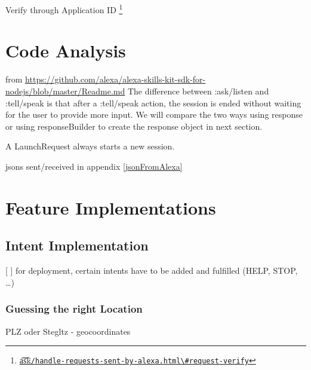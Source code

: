 Verify through Application ID \footnote{\href{https://developer.amazon.com/docs/custom-skills/handle-requests-sent-by-alexa.html\#request-verify}{\t{a\t{sk}}\lstinline|/handle-requests-sent-by-alexa.html\#request-verify|}}








\section{Code Analysis}

from \url{https://github.com/alexa/alexa-skills-kit-sdk-for-nodejs/blob/master/Readme.md}
The difference between :ask/listen and :tell/speak is that after a :tell/speak action, the session is ended without waiting for the user to provide more input. We will compare the two ways using response or using responseBuilder to create the response object in next section.



A LaunchRequest always starts a new session.







jsons sent/received in appendix
\ref{jsonFromAlexa}













\section[Features]{Feature Implementations}



\subsection*{Intent Implementation}
[ ] for deployment, certain intents have to be added and fulfilled (HELP, STOP, …)



\subsubsection*{Guessing the right Location}
PLZ oder Stegltz - geocoordinates



